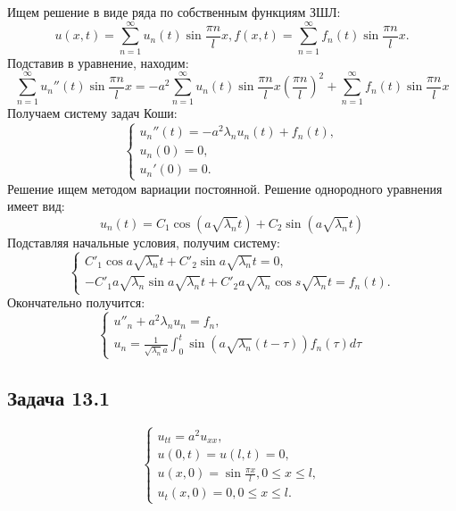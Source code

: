 \documentclass[11pt]{article}
\begin{document}
Ищем решение в виде ряда по собственным функциям ЗШЛ:
\begin{equation}
u(x, t) = \sum_{n = 1}^{\infty}u_n(t)\sin\frac{\pi n}lx,
f(x, t) = \sum_{n = 1}^{\infty}f_n(t)\sin\frac{\pi n}lx.
\end{equation}
Подставив в уравнение, находим:
\begin{equation}
\sum_{n = 1}^{\infty}u_n''(t)\sin\frac{\pi n}lx = -a^2\sum_{n = 1}^{\infty}u_n(t)\sin\frac{\pi n}lx\left(\frac{\pi n}l\right)^2 +
\sum_{n = 1}^{\infty}f_n(t)\sin\frac{\pi n}lx
\end{equation}
Получаем систему задач Коши:
\begin{equation}
\begin{cases}
u_n''(t) = -a^2\lambda_nu_n(t) + f_n(t), \\
u_n(0) = 0, \\
u_n'(0) = 0.
\end{cases}
\end{equation}
Решение ищем методом вариации постоянной. Решение однородного уравнения имеет вид:
\begin{equation}
u_n(t) = C_1\cos(a\sqrt{\lambda_n}t) + C_2\sin(a\sqrt{\lambda_n}t)
\end{equation}
Подставляя начальные условия, получим систему:
\begin{equation}
\begin{cases}
C'_1\cos a\sqrt{\lambda_n}t + C'_2\sin a\sqrt{\lambda_n}t = 0, \\
-C'_1a\sqrt{\lambda_n}\sin a\sqrt{\lambda_n}t + C'_2a\sqrt{\lambda_n}\cos s\sqrt{\lambda_n}t = f_n(t).
\end{cases}
\end{equation}
Окончательно получится:
\begin{equation}
\begin{cases}
u''_n + a^2\lambda_nu_n = f_n, \\
u_n = \frac1{\sqrt{\lambda_n}a}\int_0^t\sin(a\sqrt{\lambda_n}(t - \tau))f_n(\tau)d\tau
\end{cases}
\end{equation}
\subsection{Задача 13.1}
\label{sec:orgfbfab29}
\begin{equation}
\begin{cases}
u_{tt} = a^2u_{xx}, \\
u(0, t) = u(l, t) = 0, \\
u(x, 0) = \sin\frac{\pi x}l, 0 \leq x \leq l, \\
u_t(x, 0) = 0, 0 \leq x \leq l.
\end{cases}
\end{equation}
\end{document}
